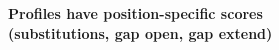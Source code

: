 \documentclass[landscape]{slides}
\begin{document}
\begin{slide}
\begin{center}
\textbf{Profiles have position-specific scores \\ (substitutions, gap
    open, gap extend)}
\end{center}


\vfill
\end{slide}
\end{document}
